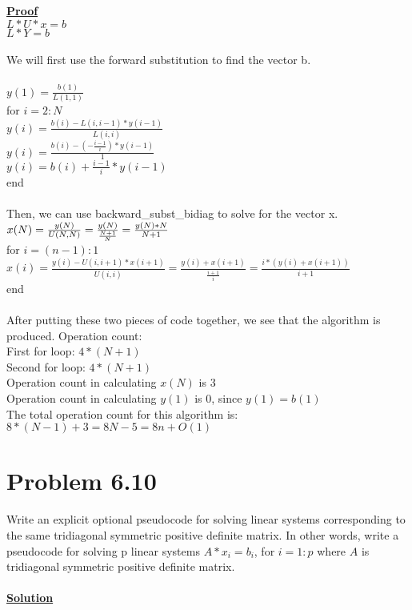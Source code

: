 \documentclass{article}
\DeclareMathOperator{\1}{\mathit{1}}
\numberwithin{figure}{section} %
\numberwithin{table}{section}
\begin{document}
\underline{\textbf {Proof}} \\
	\indent \(L*U*x=b\)\\
	\indent \(L*Y=b\)\\\\
We will first use the forward substitution to find the vector b. \\\\
\(y(1) = \frac{b(1)}{L(1,1)}\)\\
for \(i=2:N\)\\
	\indent \(y(i) = \frac{b(i)-L(i,i-1)*y(i-1)}{L(i,i)}\)\\
	\indent \(y(i) = \frac{b(i)-(-\frac{i-1}{i})*y(i-1)}{1}\)\\
	\indent \(y(i) = b(i)+\frac{i-1}{i}*y(i-1)\)\\
end\\\\
Then, we can use backward\_subst\_bidiag to solve for the vector x.\\
\indent \(x(N) = \frac{y(N)}{U(N,N)} = \frac{y(N)}{\frac{N+1}{N}}= \frac{y(N)*N}{N+1}\\\)\\
for \(i =(n-1):1\)\\
\indent \(x(i)=\frac{y(i) - U(i,i+1)*x(i+1)}{U(i,i)} = \frac{y(i) + x(i+1)}{\frac{i+1}{i}} = \frac{i*(y(i) + x(i+1))}{i+1}   \)\\
end\\\\
After putting these two pieces of code together, we see that the algorithm is produced.
Operation count:\\
	\indent First for loop: \(4*(N+1)\)\\
	\indent Second for loop: \(4*(N+1)\)\\
	\indent Operation count in calculating \(x(N)\) is 3\\
	\indent Operation count in calculating \(y(1)\) is 0, since \(y(1)=b(1)\)\\ 
The total operation count for this algorithm is: \(8*(N-1) + 3 = 8N - 5 = 8n+O(1)\)

\newpage{}
\section{Problem 6.10}

\par Write an explicit optional pseudocode for solving linear systems corresponding to the same tridiagonal symmetric positive definite matrix. In other words, write a pseudocode for solving p linear systems \(A*x_i = b_i\), for \(i=1:p\) where \(A\) is tridiagonal symmetric positive definite matrix.\\\\
\underline{\textbf {Solution}} \\
\end{document}
